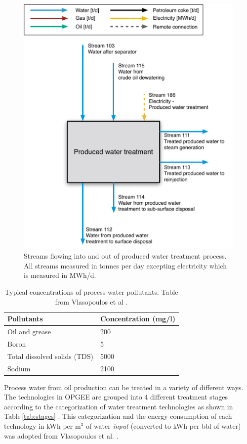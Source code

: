 \documentclass[11pt]{report}
\begin{document}
\begin{figure}
\includegraphics[width=0.8\columnwidth]{images/produced_water_treatment_PF.pdf}
\caption{Streams flowing into and out of produced water treatment process. All streams measured in tonnes per day excepting electricity which is measured in MWh/d.}
\label{fig:produced_water_treatment_PF}
\end{figure}



\begin{table}
\begin{scriptsize}
\caption{Typical concentrations of process water pollutants. Table from Vlasopoulos et al \cite{Vlasopoulos2006}.}
\label{tab:water_quality}
\begin{tabular*}{0.75\columnwidth}{p{}p{}}
\toprule
Pollutants & Concentration (mg/l) \\
\midrule
Oil and grease & 200 \\
Boron & 5 \\
Total dissolved solids (TDS) & 5000 \\
Sodium & 2100 \\
\bottomrule
\end{tabular*}
\end{scriptsize}
\end{table}

Process water from oil production can be treated in a variety of different ways. The technologies in OPGEE are grouped into 4 different treatment stages according to the categorization of water treatment technologies as shown in Table\,\ref{tab:stages} \cite{Dillon2003}. This categorization and the energy consumption of each technology in kWh per m$^3$ of water \textit{input} (converted to kWh per bbl of water) was adopted from Vlasopoulos et al. \cite{Vlasopoulos2006}.
\end{document}

